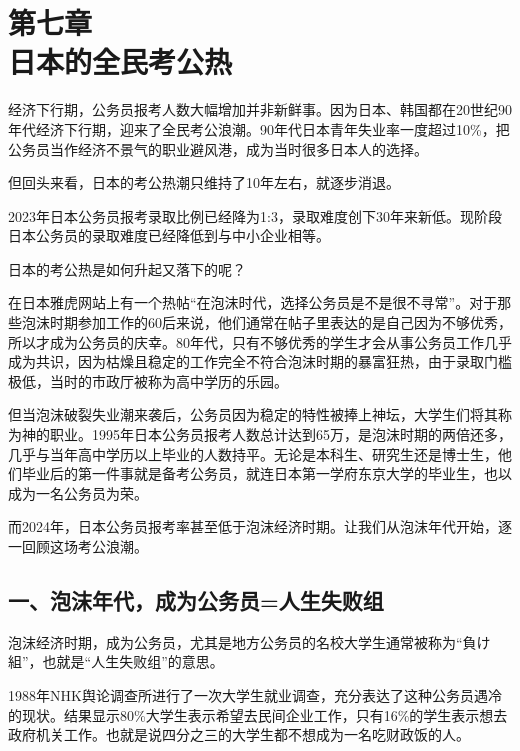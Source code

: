 

\section[第七章\q 日本的全民考公热]{第七章\\ 日本的全民考公热}


{\fangsong 经济下行期，公务员报考人数大幅增加并非新鲜事。因为日本、韩国都在20世纪90年代经济下行期，迎来了全民考公浪潮。90年代日本青年失业率一度超过10\%，把公务员当作经济不景气的职业避风港，成为当时很多日本人的选择。\par}

{\fangsong 但回头来看，日本的考公热潮只维持了10年左右，就逐步消退。\par}

{\fangsong 2023年日本公务员报考录取比例已经降为1:3，录取难度创下30年来新低。现阶段日本公务员的录取难度已经降低到与中小企业相等。\par}

{\fangsong 日本的考公热是如何升起又落下的呢？\par}

在日本雅虎网站上有一个热帖“在泡沫时代，选择公务员是不是很不寻常”。对于那些泡沫时期参加工作的60后来说，他们通常在帖子里表达的是自己因为不够优秀，所以才成为公务员的庆幸。80年代，只有不够优秀的学生才会从事公务员工作几乎成为共识，因为枯燥且稳定的工作完全不符合泡沫时期的暴富狂热，由于录取门槛极低，当时的市政厅被称为高中学历的乐园。

但当泡沫破裂失业潮来袭后，公务员因为稳定的特性被捧上神坛，大学生们将其称为神的职业。1995年日本公务员报考人数总计达到65万，是泡沫时期的两倍还多，几乎与当年高中学历以上毕业的人数持平。无论是本科生、研究生还是博士生，他们毕业后的第一件事就是备考公务员，就连日本第一学府东京大学的毕业生，也以成为一名公务员为荣。

而2024年，日本公务员报考率甚至低于泡沫经济时期。让我们从泡沫年代开始，逐一回顾这场考公浪潮。

\subsection{一、泡沫年代，成为公务员=人生失败组}

泡沫经济时期，成为公务员，尤其是地方公务员的名校大学生通常被称为“負け組”，也就是“人生失败组”的意思。

1988年NHK舆论调查所进行了一次大学生就业调查，充分表达了这种公务员遇冷的现状。结果显示80\%大学生表示希望去民间企业工作，只有16\%的学生表示想去政府机关工作。也就是说四分之三的大学生都不想成为一名吃财政饭的人。


